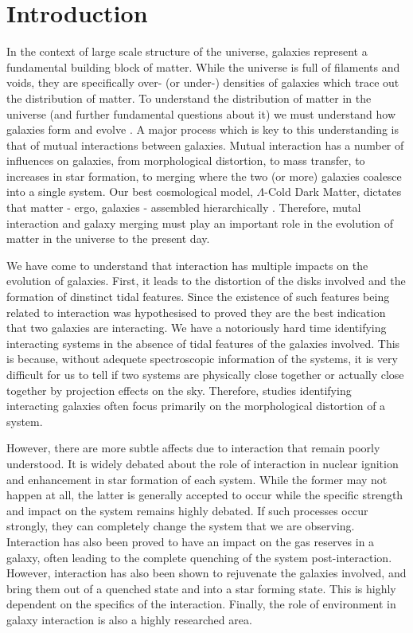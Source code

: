 \chapter{Introduction}
In the context of large scale structure of the universe, galaxies represent a fundamental building block of matter. While the universe is full of filaments and voids, they are specifically over- (or under-) densities of galaxies which trace out the distribution of matter. To understand the distribution of matter in the universe (and further fundamental questions about it) we must understand how galaxies form and evolve \citep{2005Natur.435..629S}. A major process which is key to this understanding is that of mutual interactions between galaxies. Mutual interaction has a number of influences on galaxies, from morphological distortion, to mass transfer, to increases in star formation, to merging where the two (or more) galaxies coalesce into a single system. Our best cosmological model, $\Lambda$-Cold Dark Matter, dictates that matter - ergo, galaxies - assembled hierarchically \citep{}. Therefore, mutal interaction and galaxy merging must play an important role in the evolution of matter in the universe to the present day.

We have come to understand that interaction has multiple impacts on the evolution of galaxies. First, it leads to the distortion of the disks involved and the formation of dinstinct tidal features. Since the existence of such features being related to interaction was hypothesised to proved \citep{Toomre_72} they are the best indication that two galaxies are interacting. We have a notoriously hard time identifying interacting systems in the absence of tidal features of the galaxies involved. This is because, without adequete spectroscopic information of the systems, it is very difficult for us to tell if two systems are physically close together or actually close together by projection effects on the sky. Therefore, studies identifying interacting galaxies often focus primarily on the morphological distortion of a system.

However, there are more subtle affects due to interaction that remain poorly understood. It is widely debated about the role of interaction in nuclear ignition and enhancement in star formation of each system. While the former may not happen at all, the latter is generally accepted to occur while the specific strength and impact on the system remains highly debated. If such processes occur strongly, they can completely change the system that we are observing. Interaction has also been proved to have an impact on the gas reserves in a galaxy, often leading to the complete quenching of the system post-interaction. However, interaction has also been shown to rejuvenate the galaxies involved, and bring them out of a quenched state and into a star forming state. This is highly dependent on the specifics of the interaction. Finally, the role of environment in galaxy interaction is also a highly researched area.

